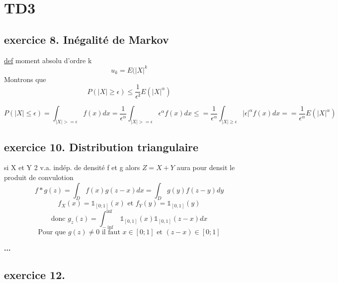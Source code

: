 \documentclass[a4paper]{report}
\newcommand{\exo}[1]{\subsection*{exercice #1}}
\begin{document}
\section*{TD3}
\subsection*{exercice 8.  Inégalité de Markov} 
\underline{def} moment absolu d'ordre k $$u_k = E(|X|^{k}$$
Montrons que $$P(|X|\geq\epsilon)\leq\dfrac{1}{\epsilon²}E(|X|^{\alpha})$$

$$ P(|X|\leq\epsilon)=\int_{|X|>=\epsilon}f(x)dx=\frac{1}{\epsilon^{\alpha}}\int_{|X|>=\epsilon}\epsilon^{\alpha}f(x)dx\leq=\frac{1}{\epsilon^{\alpha}}\int_{|X|\geq\epsilon}|\epsilon|^{\alpha}f(x)dx==\frac{1}{\epsilon^{\alpha}}E(|X|^{\alpha}) $$


\subsection*{exercice 10. Distribution triangulaire}
si X et Y 2 v.a. indép. de densité f et g alors $Z=X+Y$ aura pour densit le produit de convulotion
$$f*g(z)=\int_{D}f(x)g(z-x)dx=\int_Dg(y)f(z-y)dy$$
$$f_X(x)=\mathbb{1}_{[0;1]}(x) \text{ et } f_Y(y)=\mathbb{1}_{[0,1]}(y)$$
$$\text{donc  } g_z(z)=\int_{-\inf}^{\inf}\mathbb{1}_{[0,1]}(x)\mathbb{1}_{[0,1]}(z-x)dx$$
$$\text{Pour que } g(z)\ne0 \text{ il faut }x\in[0;1]\text{ et } (z-x)\in[0;1]$$

\textbf{...}

\exo{12.}
\end{document}
